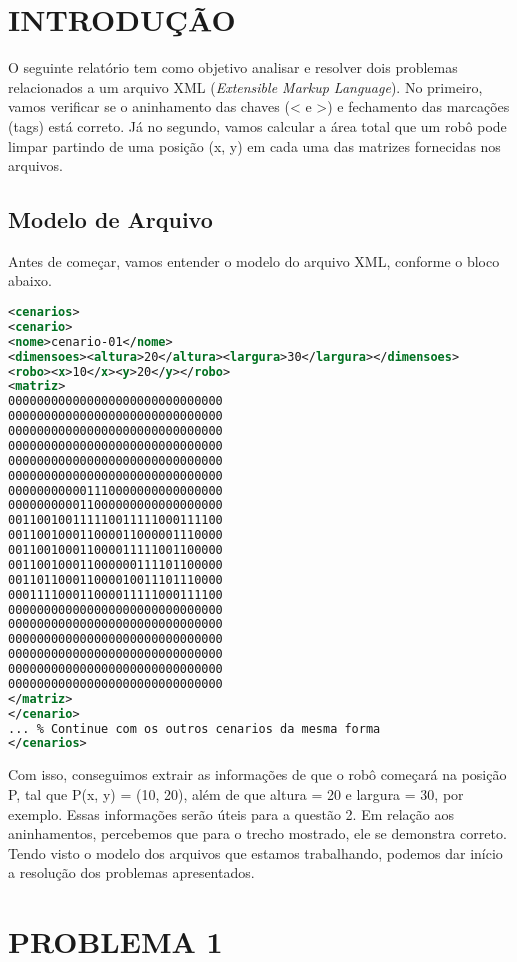 \section{INTRODUÇÃO}

O seguinte relatório tem como objetivo analisar e resolver dois problemas relacionados a um arquivo XML (\textit{Extensible Markup Language}). No primeiro, vamos verificar se o aninhamento das chaves (< e >) e fechamento das marcações (tags) está correto. Já no segundo, vamos calcular a área total que um robô pode limpar partindo de uma posição (x, y) em cada uma das matrizes fornecidas nos arquivos.

\subsection{Modelo de Arquivo}

Antes de começar, vamos entender o modelo do arquivo XML, conforme o bloco abaixo.

\begin{lstlisting}[language=XML]
<cenarios>
<cenario>
<nome>cenario-01</nome>
<dimensoes><altura>20</altura><largura>30</largura></dimensoes>
<robo><x>10</x><y>20</y></robo>
<matriz>
000000000000000000000000000000
000000000000000000000000000000
000000000000000000000000000000
000000000000000000000000000000
000000000000000000000000000000
000000000000000000000000000000
000000000001110000000000000000
000000000011000000000000000000
001100100111110011111000111100
001100100011000011000001110000
001100100011000011111001100000
001100100011000000111101100000
001101100011000010011101110000
000111100011000011111000111100
000000000000000000000000000000
000000000000000000000000000000
000000000000000000000000000000
000000000000000000000000000000
000000000000000000000000000000
000000000000000000000000000000
</matriz>
</cenario>
... % Continue com os outros cenarios da mesma forma
</cenarios>
\end{lstlisting}

Com isso, conseguimos extrair as informações de que o robô começará na posição P, tal que P(x, y) = (10, 20), além de que altura = 20 e largura = 30, por exemplo. Essas informações serão úteis para a questão 2. Em relação aos aninhamentos, percebemos que para o trecho mostrado, ele se demonstra correto. Tendo visto o modelo dos arquivos que estamos trabalhando, podemos dar início a resolução dos problemas apresentados.

\section{PROBLEMA 1}

